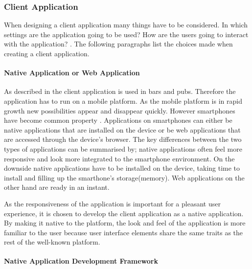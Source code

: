 \subsubsection{Client Application}
\label{ssub:client_application}

When designing a client application many things have to be considered.  In which settings are the application going to be used? How are the users going to interact with the application? . The following paragraphs list the choices made when creating a client application.

\paragraph{Native Application or Web Application}
\label{par:native_application_or_web_application}

As described in  the client application is used in bars and pubs. Therefore the application has to run on a mobile platform. As the mobile platform is in rapid growth new possibilities appear and disappear quickly. However smartphones have become common property . Applications on smartphones can either be native applications that are installed on the device or be web applications that are accessed through the device's browser. The key differences between the two types of applications can be summarised by; native applications often feel more responsive and look more integrated to the smartphone environment. On the downside native applications have to be installed on the device, taking time to install and filling up the smarthone's storage(memory). Web applications on the other hand are ready in an instant.

As the responsiveness of the application is important for a pleasant user experience, it is chosen to develop the client application as a native application. By making it native to the platform, the look and feel of the application is more familiar to the user because user interface elements share the same traits as the rest of the well-known platform.

\paragraph{Native Application Development Framework}
\label{par:native_application_development_framework}

